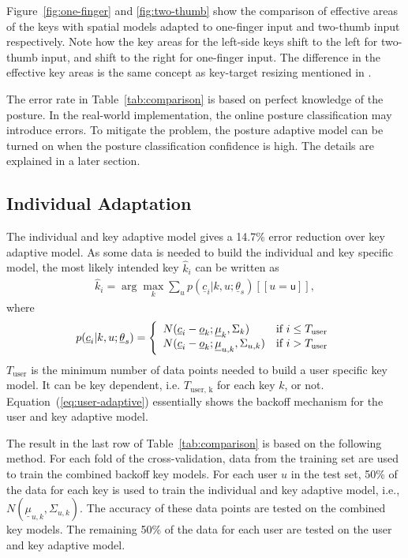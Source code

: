 \documentclass{sigchi}
\begin{document}
Figure~\ref{fig:one-finger} and \ref{fig:two-thumb} show the comparison of effective areas of the keys
with spatial models adapted to one-finger input and two-thumb input respectively. Note how the key areas for the left-side keys shift to the left
for two-thumb input, and shift to the right for one-finger input. The difference in 
the effective key areas is the same concept as key-target resizing mentioned in \cite{Gunawardana:2010, Rudchenko:2011}.

The error rate in Table~\ref{tab:comparison} is based on perfect knowledge of
the posture. In the real-world implementation, the online posture classification may
introduce errors. To mitigate the problem, the posture adaptive model can be turned on
when the posture classification confidence is high. The details are explained in a later section.

\subsection{Individual Adaptation}
The individual and key adaptive model gives a 14.7\% error reduction over key adaptive model. As some data is needed to build the individual and key specific model, the most likely intended key $\hat k_i$ can be written as
\begin{align}          
\hat k_i = \arg\max_k \sum_{u} p(\underline c_i | k, u; \underline\theta_s)[[u = \textsf{u}]],
\end{align}
where
\begin{align}
p(\underline c_i | k, u; \underline\theta_s) = \left\{
  \begin{array}{l l}
  N(\underline c_i - \underline o_k; \underline \mu_{k}, \Sigma_{k}) & \text{if $i \le T_\text{user}$} \\
  N(\underline c_i -  \underline o_k; \underline \mu_{u, k}, \Sigma_{u, k}) & \text{if $i >T_\text{user}$} \\
\end{array} \right. \label{eq:user-adaptive}
\end{align}
$T_\text{user}$ is the minimum number of data points needed to build a user specific key model. 
It can be key dependent, i.e. $T_\text{user, k}$ for each key $k$, or not. Equation~(\ref{eq:user-adaptive}) 
essentially shows the backoff mechanism for the user and key adaptive model.

The result in the last row of Table~\ref{tab:comparison} is based on the 
following method. For each fold of the cross-validation, data from the training set are used to 
train the combined backoff key models. For each user $u$ in the test set,
50\% of the data for each key is used to train the individual and key adaptive
model, i.e., $N(\underline \mu_{u, k}, \Sigma_{u, k})$.
The accuracy of these data points are tested on the combined key models.
The remaining 50\% of the data for each user are tested on the user and key adaptive 
model. 
\end{document}
